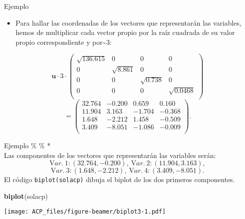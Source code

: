 \documentclass[
  spanish,
  ignorenonframetext,
]{beamer}
\newenvironment{Shaded}{\begin{snugshade}}{\end{snugshade}}
\newcommand{\KeywordTok}[1]{\textcolor[rgb]{0.13,0.29,0.53}{\textbf{#1}}}
\newcommand{\NormalTok}[1]{#1}
\providecommand{\tightlist}{%
  \setlength{\itemsep}{0pt}\setlength{\parskip}{0pt}}
\begin{document}
\begin{frame}{Ejemplo}
\protect\hypertarget{ejemplo-27}{}
\begin{itemize}
\tightlist
\item
  Para hallar las coordenadas de los vectores que representarán las
  variables, hemos de multiplicar cada vector propio por la raíz
  cuadrada de su valor propio correspondiente y
  por\textasciitilde{}\(3\):
\end{itemize}

\[
\mathbf{u}\cdot 3\cdot
\begin{pmatrix}
\sqrt{136.615}&0&0&0\\
0&\sqrt{8.861}&0&0\\
0&0&\sqrt{0.738}&0\\
0&0&0&\sqrt{0.0468}\\
\end{pmatrix} \] \[=
\left(
\begin{array}{rrrr}
32.764 & -0.200 & 0.659 & 0.160 \\
 11.904 & 3.163 & -1.704 & -0.368 \\
 1.648 & -2.212 & 1.458 & -0.509 \\
 3.409 & -8.051 & -1.086 & -0.009 \\
\end{array}
\right).
\]
\end{frame}

\begin{frame}[fragile]{Ejemplo}
\protect\hypertarget{ejemplo-28}{}
\% \% *\\
Las componentes de los vectores que representarán las variables serán:
\[
{\mathrm Var.\  1:} (32.764,-0.200),\ {\mathrm Var.\  2:} (11.904,3.163),
\] \[
{\mathrm Var. \  3:} (1.648,-2.212),\ {\mathrm Var.\  4:} (3.409,-8.051).
\] El código \texttt{biplot(solacp)} dibuja el biplot de los dos
primeros componentes.

\begin{Shaded}
\begin{Highlighting}[]
\KeywordTok{biplot}\NormalTok{(solacp)}
\end{Highlighting}
\end{Shaded}

\texttt{[image: ACP\_files/figure-beamer/biplot3-1.pdf]}
\end{frame}
\end{document}
